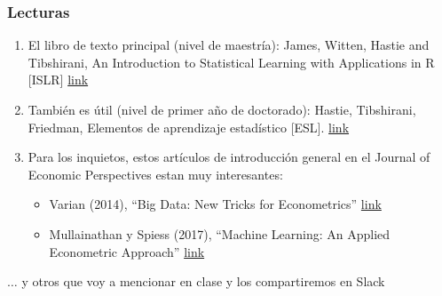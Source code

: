 \documentclass[
  shownotes,
  xcolor={svgnames},
  hyperref={colorlinks,citecolor=DarkBlue,linkcolor=DarkRed,urlcolor=DarkBlue}
  , aspectratio=169]{beamer}
\begin{document}
\begin{frame}
\frametitle{Lecturas}


\begin{enumerate}


\item El libro de texto principal (nivel de maestría): James, Witten, Hastie and Tibshirani, An Introduction to Statistical Learning with Applications in R [ISLR] \href{https://www.statlearning.com/}{link}
\medskip
\item También es útil (nivel de primer año de doctorado): Hastie, Tibshirani, Friedman, Elementos de aprendizaje estadístico [ESL]. \href{https://web.stanford.edu/~hastie/ElemStatLearn/}{link} 
\medskip
\item Para los inquietos, estos artículos de introducción general en el Journal of Economic Perspectives estan muy interesantes:
  \begin{itemize}
    \item Varian (2014), “Big Data: New Tricks for Econometrics” \href{https://www.aeaweb.org/articles?id=10.1257/jep.28.2.3}{link}
    \item Mullainathan y Spiess (2017), “Machine Learning: An Applied Econometric Approach” \href{https://www.aeaweb.org/articles?id=10.1257/jep.31.2.87}{link}
  \end{itemize}
\medskip
\end{enumerate}


$\dots$ y otros que voy a mencionar en clase y los compartiremos en Slack
\end{frame}
\end{document}
